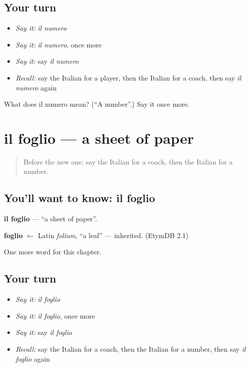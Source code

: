 \subsection*{Your turn}
\begin{itemize}
\raggedright
  \item \emph{Say it:} \emph{il numero}
  \item \emph{Say it:} \emph{il numero}, once more
  \item \emph{Say it:} say \emph{il numero}
  \item \emph{Recall:} say the Italian for a player, then the Italian for a coach, then say \emph{il numero} again
\end{itemize}

\begin{tcolorbox}[breakable,colback=teal!4,colframe=teal!35!black,title={Before you move on}]
What does il numero mean? (\textquotedblleft{}A number\textquotedblright{}.) Say it once more.
\end{tcolorbox}
\section[il foglio]{il foglio — a sheet of paper}

\label{lesson:IT-C232-foglio}



\begin{quote}
Before the new one: say the Italian for a coach, then the Italian for a number.
\end{quote}

\subsection*{You'll want to know: il foglio}
\textbf{il foglio} — \textquotedblleft{}a sheet of paper\textquotedblright{}.

\begin{cousinweb}
\textbf{foglio} $\leftarrow$ Latin \emph{folium}, \textquotedblleft{}a leaf\textquotedblright{} — inherited. (EtymDB 2.1)
\end{cousinweb}

\begin{grammarlens}[title={What you've built}]
One more word for this chapter.
\end{grammarlens}

\subsection*{Your turn}
\begin{itemize}
\raggedright
  \item \emph{Say it:} \emph{il foglio}
  \item \emph{Say it:} \emph{il foglio}, once more
  \item \emph{Say it:} say \emph{il foglio}
  \item \emph{Recall:} say the Italian for a coach, then the Italian for a number, then say \emph{il foglio} again
\end{itemize}


